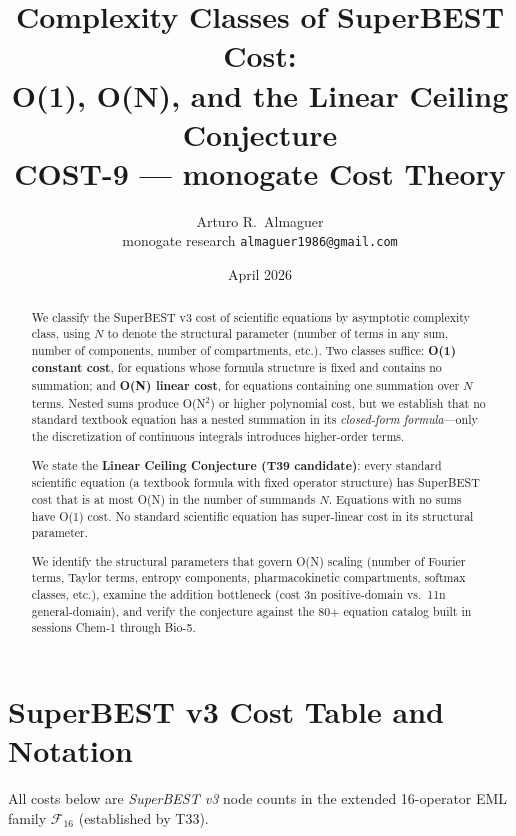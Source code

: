 \documentclass[12pt,a4paper]{article}
\title{Complexity Classes of SuperBEST Cost:\\
       O(1), O(N), and the Linear Ceiling Conjecture\\[6pt]
       \large COST-9 --- monogate Cost Theory}
\author{Arturo R.\ Almaguer\\
\small monogate research \quad \texttt{almaguer1986@gmail.com}}
\date{April 2026}
\theoremstyle{definition}
\begin{document}
\maketitle

\begin{abstract}
We classify the SuperBEST v3 cost of scientific equations by asymptotic
complexity class, using $N$ to denote the structural parameter (number of
terms in any sum, number of components, number of compartments, etc.).
Two classes suffice: \textbf{O(1) constant cost}, for equations whose
formula structure is fixed and contains no summation; and \textbf{O(N)
linear cost}, for equations containing one summation over $N$ terms.
Nested sums produce O(N$^2$) or higher polynomial cost, but we establish
that no standard textbook equation has a nested summation in its
\emph{closed-form formula}---only the discretization of continuous
integrals introduces higher-order terms.

We state the \textbf{Linear Ceiling Conjecture (T39 candidate)}: every
standard scientific equation (a textbook formula with fixed operator
structure) has SuperBEST cost that is at most O(N) in the number of
summands $N$.  Equations with no sums have O(1) cost.  No standard
scientific equation has super-linear cost in its structural parameter.

We identify the structural parameters that govern O(N) scaling (number
of Fourier terms, Taylor terms, entropy components, pharmacokinetic
compartments, softmax classes, etc.), examine the addition bottleneck
(cost 3n positive-domain vs.\ 11n general-domain), and verify the
conjecture against the 80$+$ equation catalog built in sessions Chem-1
through Bio-5.
\end{abstract}

\tableofcontents
\bigskip

\section{SuperBEST v3 Cost Table and Notation}
\label{sec:background}

All costs below are \emph{SuperBEST v3} node counts in the extended
16-operator EML family $\mathcal{F}_{16}$ (established by T33).
\end{document}
